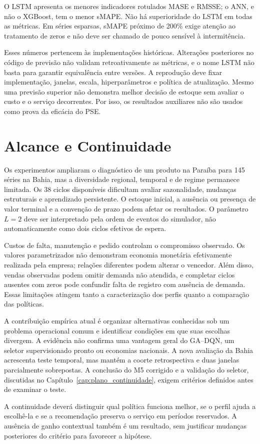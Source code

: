 O LSTM apresenta os menores indicadores rotulados MASE e RMSSE; o ANN, e não o XGBoost, tem o menor sMAPE. Não há superioridade do LSTM em todas as métricas. Em séries esparsas, sMAPE próximo de 200\% exige atenção ao tratamento de zeros e não deve ser chamado de pouco sensível à intermitência.

Esses números pertencem às implementações históricas. Alterações posteriores no código de previsão não validam retroativamente as métricas, e o nome LSTM não basta para garantir equivalência entre versões. A reprodução deve fixar implementação, janelas, escala, hiperparâmetros e política de atualização. Mesmo uma previsão superior não demonstra melhor decisão de estoque sem avaliar o custo e o serviço decorrentes. Por isso, os resultados auxiliares não são usados como prova da eficácia do PSE.

\section{Alcance e Continuidade}
\label{sec:threats}

Os experimentos ampliaram o diagnóstico de um produto na Paraíba para 145 séries na Bahia, mas a diversidade regional, temporal e de regime permanece limitada. Os 38 ciclos disponíveis dificultam avaliar sazonalidade, mudanças estruturais e aprendizado persistente. O estoque inicial, a ausência ou presença de valor terminal e a convenção de prazo podem afetar os resultados. O parâmetro $L=2$ deve ser interpretado pela ordem de eventos do simulador, não automaticamente como dois ciclos efetivos de espera.

Custos de falta, manutenção e pedido controlam o compromisso observado. Os valores parametrizados não demonstram economia monetária efetivamente realizada pela empresa; relações diferentes podem alterar o vencedor. Além disso, vendas observadas podem omitir demanda não atendida, e completar ciclos ausentes com zeros pode confundir falta de registro com ausência de demanda. Essas limitações atingem tanto a caracterização dos perfis quanto a comparação das políticas.

A contribuição empírica atual é organizar alternativas conhecidas sob um problema operacional comum e identificar condições em que suas escolhas divergem. A evidência não confirma uma vantagem geral do GA--DQN, um seletor supervisionado pronto ou economias nacionais. A nova avaliação da Bahia acrescenta teste temporal, mas mantém a coorte retrospectiva e duas janelas parcialmente sobrepostas. A conclusão do M5 corrigido e a validação do seletor, discutidas no Capítulo~\ref{cap:plano_continuidade}, exigem critérios definidos antes de examinar o teste.

A continuidade deverá distinguir qual política funciona melhor, se o perfil ajuda a escolhê-la e se a recomendação preserva o serviço em períodos reservados. A ausência de ganho contextual também é um resultado, sem justificar mudanças posteriores do critério para favorecer a hipótese.
